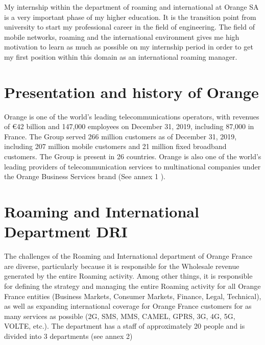 \-\hspace{0.5cm} My internship within the department of roaming and international at Orange SA is a very important phase of my higher education. It is the transition point from university to start my professional career in the field of engineering. The field of mobile networks, roaming and the international environment gives me high motivation to learn as much as possible on my internship period in order to get my first position within this domain as an international roaming manager.\\

\section{Presentation and history of Orange}

\-\hspace{0.5cm} Orange is one of the world's leading telecommunications operators, with revenues of €42 billion and 147,000 employees on December 31, 2019, including 87,000 in France. The Group served 266 million customers as of December 31, 2019, including 207 million mobile customers and 21 million fixed broadband customers. The Group is present in 26 countries. Orange is also one of the world's leading providers of telecommunication services to multinational companies under the Orange Business Services brand \cite{pres-orange} (See annex 1 \cite{annex-one}).\\

\section{Roaming and International Department \acs{DRI} }
\-\hspace{0.5cm} The challenges of the Roaming and International department of Orange France are diverse, particularly because it is responsible for the Wholesale revenue generated by the entire Roaming activity. Among other things, it is responsible for defining the strategy and managing the entire Roaming activity for all Orange France entities (Business Markets, Consumer Markets, Finance, Legal, Technical), as well as expanding international coverage for Orange France customers for as many services as possible (\acs{2G}, \acs{SMS}, \acs{MMS}, \acs{CAMEL}, \acs{GPRS}, \acs{3G}, \acs{4G}, \acs{5G}, \acs{VOLTE}, etc.). The department has a staff of approximately 20 people and is divided into 3 departments (see annex 2) \\
